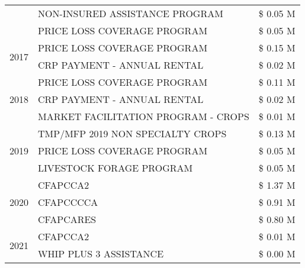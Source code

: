 \begin{tabular}{llr}
 & NON-INSURED ASSISTANCE PROGRAM & \$ 0.05 M \\
 & PRICE LOSS COVERAGE PROGRAM & \$ 0.05 M \\
\cline{1-3}
\multirow[t]{2}{*}{2017} & PRICE LOSS COVERAGE PROGRAM & \$ 0.15 M \\
 & CRP PAYMENT - ANNUAL RENTAL & \$ 0.02 M \\
\cline{1-3}
\multirow[t]{3}{*}{2018} & PRICE LOSS COVERAGE PROGRAM & \$ 0.11 M \\
 & CRP PAYMENT - ANNUAL RENTAL & \$ 0.02 M \\
 & MARKET FACILITATION PROGRAM - CROPS & \$ 0.01 M \\
\cline{1-3}
\multirow[t]{3}{*}{2019} & TMP/MFP 2019 NON SPECIALTY CROPS & \$ 0.13 M \\
 & PRICE LOSS COVERAGE PROGRAM & \$ 0.05 M \\
 & LIVESTOCK FORAGE PROGRAM & \$ 0.05 M \\
\cline{1-3}
\multirow[t]{3}{*}{2020} & CFAPCCA2 & \$ 1.37 M \\
 & CFAPCCCCA & \$ 0.91 M \\
 & CFAPCARES & \$ 0.80 M \\
\cline{1-3}
\multirow[t]{2}{*}{2021} & CFAPCCA2 & \$ 0.01 M \\
 & WHIP PLUS 3 ASSISTANCE & \$ 0.00 M \\
\cline{1-3}
\bottomrule
\end{tabular}
